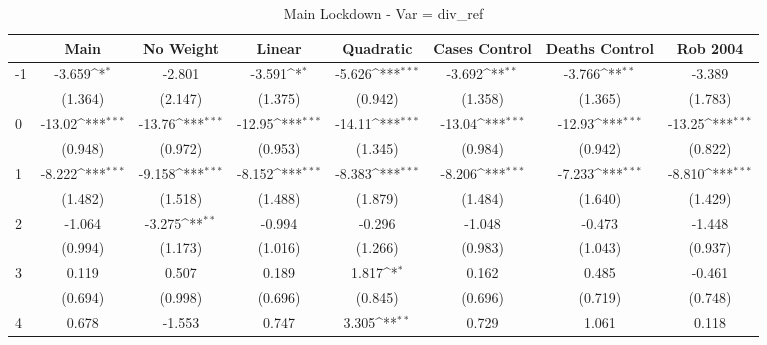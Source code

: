 \documentclass{article}
\begin{document}
{
\def\sym#1{\ifmmode^{#1}\else\(^{#1}\)\fi}
\begin{longtable}{l*{7}{c}}
\caption{Main Lockdown - Var = div\_ref}\\
\hline\hline\endfirsthead\hline\endhead\hline\endfoot\endlastfoot
                &\multicolumn{1}{c}{Main}&\multicolumn{1}{c}{No Weight}&\multicolumn{1}{c}{Linear}&\multicolumn{1}{c}{Quadratic}&\multicolumn{1}{c}{Cases Control}&\multicolumn{1}{c}{Deaths Control}&\multicolumn{1}{c}{Rob 2004}\\
\hline
-1              &   -3.659\sym{*}  &   -2.801         &   -3.591\sym{*}  &   -5.626\sym{***}&   -3.692\sym{**} &   -3.766\sym{**} &   -3.389         \\
                &  (1.364)         &  (2.147)         &  (1.375)         &  (0.942)         &  (1.358)         &  (1.365)         &  (1.783)         \\
0               &   -13.02\sym{***}&   -13.76\sym{***}&   -12.95\sym{***}&   -14.11\sym{***}&   -13.04\sym{***}&   -12.93\sym{***}&   -13.25\sym{***}\\
                &  (0.948)         &  (0.972)         &  (0.953)         &  (1.345)         &  (0.984)         &  (0.942)         &  (0.822)         \\
1               &   -8.222\sym{***}&   -9.158\sym{***}&   -8.152\sym{***}&   -8.383\sym{***}&   -8.206\sym{***}&   -7.233\sym{***}&   -8.810\sym{***}\\
                &  (1.482)         &  (1.518)         &  (1.488)         &  (1.879)         &  (1.484)         &  (1.640)         &  (1.429)         \\
2               &   -1.064         &   -3.275\sym{**} &   -0.994         &   -0.296         &   -1.048         &   -0.473         &   -1.448         \\
                &  (0.994)         &  (1.173)         &  (1.016)         &  (1.266)         &  (0.983)         &  (1.043)         &  (0.937)         \\
3               &    0.119         &    0.507         &    0.189         &    1.817\sym{*}  &    0.162         &    0.485         &   -0.461         \\
                &  (0.694)         &  (0.998)         &  (0.696)         &  (0.845)         &  (0.696)         &  (0.719)         &  (0.748)         \\
4               &    0.678         &   -1.553         &    0.747         &    3.305\sym{**} &    0.729         &    1.061         &    0.118         \\

\end{longtable}}
\end{document}
